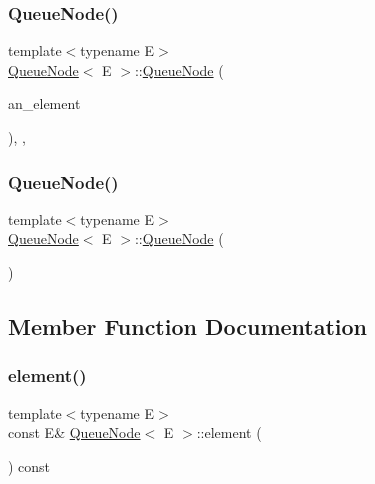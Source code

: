 \subsubsection{\texorpdfstring{QueueNode()}{QueueNode()}\hspace{0.1cm}{\footnotesize\ttfamily [5/6]}}
{\footnotesize\ttfamily template$<$typename E$>$ \\
\mbox{\hyperlink{class_queue_node}{Queue\+Node}}$<$ E $>$\+::\mbox{\hyperlink{class_queue_node}{Queue\+Node}} (\begin{DoxyParamCaption}\item[{const E \&}]{an\+\_\+element }\end{DoxyParamCaption})\hspace{0.3cm}{\ttfamily [inline]}, {\ttfamily [explicit]}, {\ttfamily [private]}}

\mbox{\label{class_queue_node_a35adcad7a84db46784907cf58106d585}} 
\subsubsection{\texorpdfstring{QueueNode()}{QueueNode()}\hspace{0.1cm}{\footnotesize\ttfamily [6/6]}}
{\footnotesize\ttfamily template$<$typename E$>$ \\
\mbox{\hyperlink{class_queue_node}{Queue\+Node}}$<$ E $>$\+::\mbox{\hyperlink{class_queue_node}{Queue\+Node}} (\begin{DoxyParamCaption}\item[{const \mbox{\hyperlink{class_queue_node}{Queue\+Node}}$<$ E $>$ \&}]{ }\end{DoxyParamCaption})\hspace{0.3cm}{\ttfamily [private]}}



\subsection{Member Function Documentation}
\mbox{\label{class_queue_node_a1c61b3ed32e089f5901b87022ef84985}} 
\subsubsection{\texorpdfstring{element()}{element()}\hspace{0.1cm}{\footnotesize\ttfamily [1/3]}}
{\footnotesize\ttfamily template$<$typename E$>$ \\
const E\& \mbox{\hyperlink{class_queue_node}{Queue\+Node}}$<$ E $>$\+::element (\begin{DoxyParamCaption}{ }\end{DoxyParamCaption}) const\hspace{0.3cm}{\ttfamily [inline]}}


